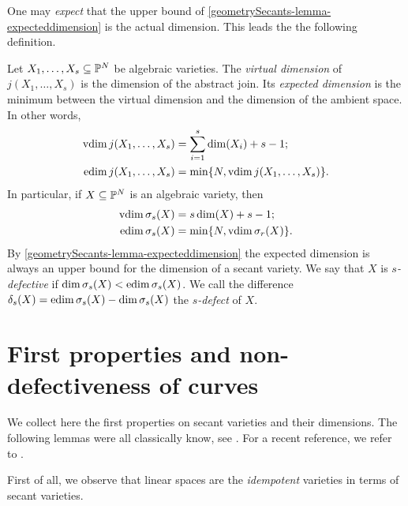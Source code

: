 One may {\it expect} that the upper bound of \ref{geometrySecants-lemma-expecteddimension} is the actual dimension. This leads the the following definition. 
\begin{definition}
\label{geometrySecants-definition-expecteddimension}
    Let $X_1, \ldots , X_s \subseteq \mathbb{P}^N$ be algebraic varieties. The {\it virtual dimension} of $j(X_1,\ldots,X_s)$ is the dimension of the abstract join. Its {\it expected dimension} is the minimum between the virtual dimension and the dimension of the ambient space. In other words,
    \begin{align*}
        \operatorname{vdim} j(X_1,\ldots,X_s) & = \sum_{i=1}^s \dim(X_i) + s-1; \\ 
        \operatorname{edim} j(X_1,\ldots,X_s) & = \min \{N,\operatorname{vdim} j(X_1,\ldots,X_s)\}.
    \end{align*}
    In particular, if $X \subseteq \mathbb{P}^N$ is an algebraic variety, then
    \begin{align*}
        \operatorname{vdim} \sigma_s(X) & = s\dim(X) + s-1; \\ 
        \operatorname{edim} \sigma_s(X) & = \min \{N,\operatorname{vdim} \sigma_r(X)\}.
    \end{align*}
By \ref{geometrySecants-lemma-expecteddimension} the expected dimension is always an upper bound for the dimension of a secant variety. We say that $X$ is \emph{$s$-defective} if $\dim \sigma_s(X) < \operatorname{edim}\sigma_s(X)$. We call the difference $\delta_s(X) = \operatorname{edim}\sigma_s(X) - \dim \sigma_s(X)$ the \emph{$s$-defect} of $X$. 

\end{definition}

\section{First properties and non-defectiveness of curves}
\label{geometrySecants-section-first_properties}
We collect here the first properties on secant varieties and their dimensions. The following lemmas were all classically know, see \cite{Pal09}. For a recent reference, we refer to \cite{Rus16}.

First of all, we observe that linear spaces are the \emph{idempotent} varieties in terms of secant varieties. 

